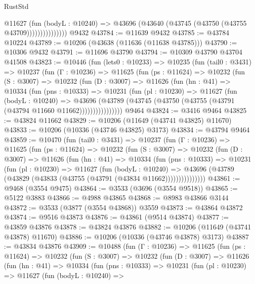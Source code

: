 \begin{lexlean}{RustStd}
\begin{coremodule}
                      @11627
                        (fun (bodyL : @10240) =>
                        @43696 (@43640 (@43745 (@43750 (@43755 @43709)))))))))))))))
    @9432
@43784 := @11639 @9432
@43785 := @43784 @10224
@43789 := @10206 (@43638 (@11636 (@11638 @43785)))
@43790 := @10306 @9432
@43791 := @11696 @43790
@43794 := @10309 @43790 @43704 @41508
@43823 := @10446
    (fun (lets0 : @10233) =>
    @10235
      (fun (tail0 : @3431) =>
      @10237
        (fun (Γ : @10236) =>
        @11625
          (fun (ps : @11624) =>
          @10232
            (fun (S : @3007) =>
            @10232
              (fun (D : @3007) =>
              @11626
                (fun (hn : @41) =>
                @10334
                  (fun (pns : @10333) =>
                  @10231
                    (fun (pl : @10230) =>
                    @11627
                      (fun (bodyL : @10240) =>
                      @43696
                        (@43789
                          (@43745 (@43750 (@43755 (@43791 (@43794 @11660 @11662))))))))))))))))
    @9464
@43824 := @3416 @9464
@43825 := @43824 @11662
@43829 := @10206 (@11649 (@43741 @43825) @11670)
@43833 := @10206 (@10336 (@43746 @43825) @3173)
@43834 := @43794 @9464
@43859 := @10470
    (fun (tail0 : @3431) =>
    @10237
      (fun (Γ : @10236) =>
      @11625
        (fun (ps : @11624) =>
        @10232
          (fun (S : @3007) =>
          @10232
            (fun (D : @3007) =>
            @11626
              (fun (hn : @41) =>
              @10334
                (fun (pns : @10333) =>
                @10231
                  (fun (pl : @10230) =>
                  @11627
                    (fun (bodyL : @10240) =>
                    @43696 (@43789 (@43829 (@43833 (@43755 (@43791 (@43834 @11662)))))))))))))))
@43861 := @9468 (@3554 @9475)
@43864 := @3533 (@3696 (@3554 @9518))
@43865 := @5122 @3883
@43866 := @4988 @43865
@43868 := @8983 @43866 @3144
@43872 := @3533 (@3877 (@3554 @43868)) @3559
@43873 := @43864 @43872
@43874 := @9516 @43873
@43876 := @43861 (@9514 @43874)
@43877 := @43859 @43876
@43878 := @43824 @43876
@43882 := @10206 (@11649 (@43741 @43878) @11670)
@43886 := @10206 (@10336 (@43746 @43878) @3173)
@43887 := @43834 @43876
@43909 := @10488
    (fun (Γ : @10236) =>
    @11625
      (fun (ps : @11624) =>
      @10232
        (fun (S : @3007) =>
        @10232
          (fun (D : @3007) =>
          @11626
            (fun (hn : @41) =>
            @10334
              (fun (pns : @10333) =>
              @10231
                (fun (pl : @10230) =>
                @11627
                  (fun (bodyL : @10240) =>

\end{coremodule}
\end{lexlean}
